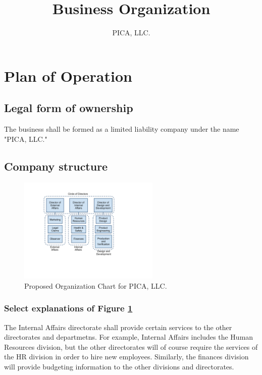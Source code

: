 \documentclass[11pt,letterpaper]{article}
\title{Business Organization}
\author{PICA, LLC.}
\begin{document}
\maketitle

\section{Plan of Operation}


\subsection{Legal form of ownership}
The business shall be formed as a limited liability company under the name "PICA, LLC."

\subsection{Company structure}

\begin{figure}[htbp]
 \begin{center}
  \includegraphics[trim=1.5in 1.75in 3in 0.75in,clip,width=0.6\textwidth]{includes/PICA_LLC_Org_Chart}
 \end{center}
 \caption{Proposed Organization Chart for PICA, LLC.}
 \label{fig:org-chart}
\end{figure}

\subsubsection{Select explanations of Figure \ref{fig:org-chart} }
The Internal Affairs directorate shall provide certain services to the other directorates and departmetns. For example, Internal Affairs includes the Human Resources division, but the other directorates will of course require the services of the HR division in order to hire new employees. Similarly, the finances division will provide budgeting information to the other divisions and directorates.
\end{document}
